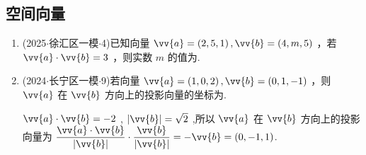 \subsection*{空间向量}
\begin{enumerate}
    \item (2025$\cdot$徐汇区一模$\cdot$4)已知向量 $\vv{a} = \left( {2,5,1}\right) ,\vv{b} = \left( {4,m,5}\right)$ ，若 $\vv{a} \cdot  \vv{b} = 3$ ，则实数 $m$ 的值为.

    \item (2024$\cdot$长宁区一模$\cdot$9)若向量 $\vv{a} = \left( {1,0,2}\right) ,\vv{b} = \left( {0,1, - 1}\right)$ ，则 $\vv{a}$ 在 $\vv{b}$ 方向上的投影向量的坐标为.
\begin{jieda}
    $\vv{a} \cdot  \vv{b} =  - 2$ , $\left| \vv{b}\right|  = \sqrt{2}$ ,所以 $\vv{a}$ 在 $\vv{b}$ 方向上的投影向量为 $\dfrac{\vv{a} \cdot  \vv{b}}{\left| \vv{b}\right| } \cdot  \dfrac{\vv{b}}{\left| \vv{b}\right| } =  - \vv{b} = \left( {0, - 1,1}\right)$.
\end{jieda}


\end{enumerate}
